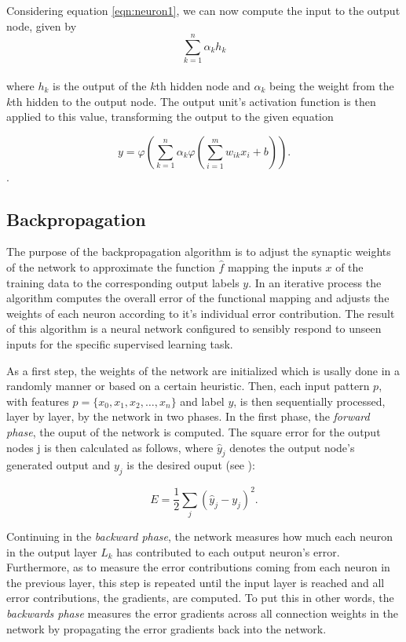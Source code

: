 Considering equation \ref{eqn:neuron1}, we can now compute the input to the output node, given by\\
\begin{equation}
  \sum_{k=1}^{n} \alpha_k h_k
\end{equation}
\\
where $h_k$ is the output of the $k$th hidden node and $\alpha_k$ being the weight from the $k$th hidden to the output node. The output unit's activation function is then applied to this value, transforming the output to the given equation

\begin{equation}
  y = \varphi\left(\sum_{k=1}^{n} \alpha_k \varphi \left(\sum_{i=1}^{m} w_{ik} x_i + b \right)\right).
\end{equation}.

\subsection{Backpropagation}
\label{sec:backprop}
The purpose of the backpropagation algorithm \cite{rumelhart1988learning} is to adjust the synaptic weights of the network to approximate the function $\hat f$ mapping the inputs $x$ of the training data to the corresponding output labels $y$. In an iterative process the algorithm computes the overall error of the functional mapping and adjusts the weights of each neuron according to it's individual error contribution. The result of this algorithm is a neural network configured to sensibly respond to unseen inputs for the specific supervised learning task.

As a first step, the weights of the network are initialized which is usally done in a randomly manner or based on a certain heuristic. Then, each input pattern $p$, with features $p = \{x_0,x_1, x_2, \dots, x_n \}$ and label $y$, is then sequentially processed, layer by layer, by the network in two phases. In the first phase, the \textit{forward phase}, the ouput of the network is computed. The square error for the output nodes j is then calculated as follows, where $\hat{y}_j$ denotes the output node's generated output and $y_j$ is the desired ouput (see \cite{Haykin:1998:NNC:521706}):

\begin{equation}
  E = \frac{1}{2}\sum_{j} (\hat{y}_j - y_j)^2.
\end{equation}

Continuing in the \textit{backward phase}, the network measures how much each neuron in the output layer $L_k$ has contributed to each output neuron's error. Furthermore, as to measure the error contributions coming from each neuron in the previous layer, this step is repeated until the input layer is reached and all error contributions, the gradients, are computed. To put this in other words, the \textit{backwards phase} measures the error gradients across all connection weights in the network by propagating the error gradients back into the network.

